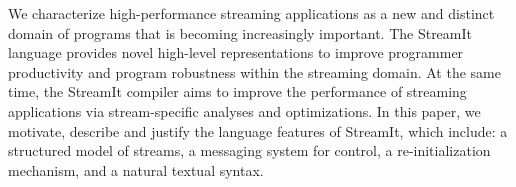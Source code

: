 We characterize high-performance streaming applications as a new and
distinct domain of programs that is becoming increasingly important.
The StreamIt language provides novel high-level representations to
improve programmer productivity and program robustness within the
streaming domain.  At the same time, the StreamIt compiler aims to
improve the performance of streaming applications via stream-specific
analyses and optimizations.  In this paper, we motivate, describe and
justify the language features of StreamIt, which include: a structured
model of streams, a messaging system for control, a re-initialization
mechanism, and a natural textual syntax.

